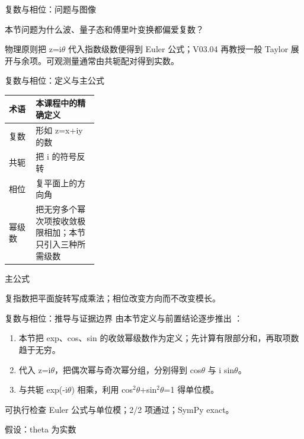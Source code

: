 \begin{frame}[t]{复数与相位：问题与图像}
\footnotesize
\begin{block}{本节问题}为什么波、量子态和傅里叶变换都偏爱复数？\end{block}
\begin{block}{物理原则}\quad 把 z=i\ensuremath{\theta} 代入指数级数便得到 Euler 公式；V03.04 再教授一般 Taylor 展开与余项。可观测量通常由共轭配对得到实数。\end{block}
\end{frame}

\begin{frame}[t]{复数与相位：定义与主公式}
\footnotesize\begin{tabularx}{\linewidth}{p{0.30\linewidth}Y}
\toprule 术语 & 本课程中的精确定义\\\midrule
{} 复数 & 形如 z=x+iy 的数\\
 共轭 & 把 i 的符号反转\\
 相位 & 复平面上的方向角\\
 幂级数 & 把无穷多个幂次项按收敛极限相加；本节只引入三种所需级数\\
\bottomrule\end{tabularx}\vspace{0.15cm}
\begin{block}{ 主公式}\centering{}\end{block}
复指数把平面旋转写成乘法；相位改变方向而不改变模长。
\end{frame}

\begin{frame}[t]{复数与相位：推导与证据边界}
\footnotesize
{}\quad 由本节定义与前置结论逐步推出 ：
\begin{enumerate}
\item 本节把 exp、cos、sin 的收敛幂级数作为定义；先计算有限部分和，再取项数趋于无穷。
\item 代入 z=i\ensuremath{\theta}，把偶次幂与奇次幂分组，分别得到 cos\ensuremath{\theta} 与 i sin\ensuremath{\theta}。
\item 与共轭 exp(-i\ensuremath{\theta}) 相乘，利用 cos\ensuremath{^{2}}\ensuremath{\theta}+sin\ensuremath{^{2}}\ensuremath{\theta}=1 得单位模。
\end{enumerate}\begin{block}{可执行检查}
\quad Euler 公式与单位模；2/2 项通过；SymPy exact。
\par\scriptsize 假设：theta 为实数
\end{block}
\end{frame}

